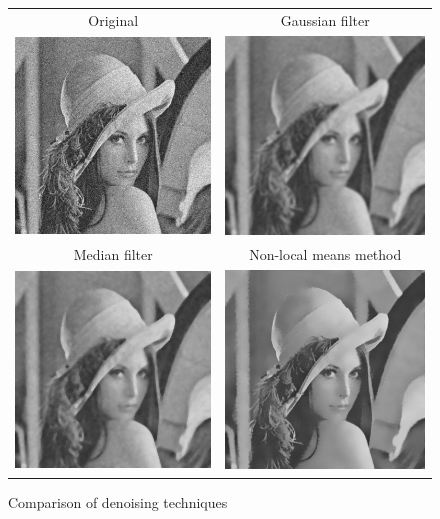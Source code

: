 \begin{figure}
\centering
{\sffamily
\begin{tabular}{cc}
Original & Gaussian filter \\
\includegraphics[width=.4\linewidth]{img/preprocessing/denoise_orig.png}
&
\includegraphics[width=.4\linewidth]{img/preprocessing/denoise_gauss.png}
\vspace{1em} \\
Median filter & Non-local means method \\
\includegraphics[width=.4\linewidth]{img/preprocessing/denoise_median.png}
&
\includegraphics[width=.4\linewidth]{img/preprocessing/denoise_nonlocal.png}
\end{tabular}
}
\caption{Comparison of denoising techniques}
\label{fig:preprocessDenoising}
\end{figure}

